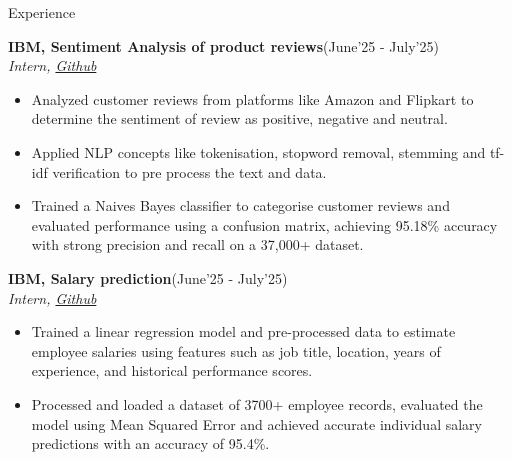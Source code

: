 \begin{rSection}{Experience}
\vspace{-.55cm}

%

\item{\bf {\bf IBM, Sentiment Analysis of product reviews}}\hfill{(June'25 - July'25)}\\
\emph{Intern, \href{https://github.com/kaulparthiv}{Github}}\\
[-0.4cm]

\begin{itemize}[leftmargin=*]

  \itemsep \sepval

  \item Analyzed customer reviews from platforms like Amazon and Flipkart to determine the sentiment of review as positive, negative and neutral.

  \item Applied NLP concepts like tokenisation, stopword removal, stemming and tf-idf verification to pre process the text and data.

  \item Trained a Naives Bayes classifier to categorise customer reviews and evaluated performance using a confusion matrix, achieving 95.18\% accuracy with strong precision and recall on a 37,000+ dataset.
   
\end{itemize}
\vspace{-.2cm}

\item{\bf {\bf IBM, Salary prediction}}\hfill{(June'25 - July'25)}\\
\emph{Intern, \href{https://github.com/kaulparthiv}{Github}}\\
[-0.4cm]

\begin{itemize}[leftmargin=*]

  \itemsep \sepval

  \item Trained a linear regression model and pre-processed data to estimate employee salaries using features such as job title, location, years of experience,  and historical performance scores.

  \item Processed and loaded a dataset of 3700+ employee records, evaluated the model using Mean Squared Error and achieved accurate individual salary predictions with an accuracy of 95.4\%.


\end{itemize}
\end{rSection}
